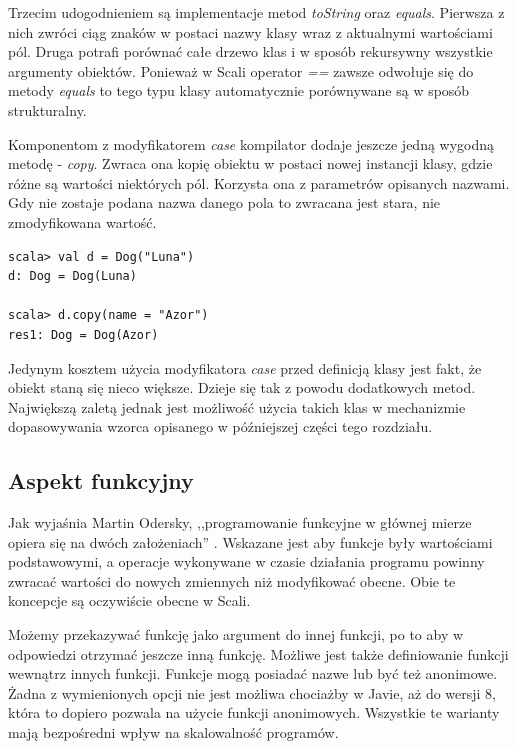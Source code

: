 \documentclass[brudnopis]{xmgr}
\begin{document}
Trzecim udogodnieniem są implementacje metod \emph{toString} oraz \emph{equals}. Pierwsza z nich zwróci ciąg znaków w postaci nazwy klasy wraz z aktualnymi wartościami pól. Druga potrafi porównać całe drzewo klas i w sposób rekursywny wszystkie argumenty obiektów. Ponieważ w Scali operator \emph{==} zawsze odwołuje się do metody \emph{equals} to tego typu klasy automatycznie porównywane są w sposób strukturalny.    

Komponentom z modyfikatorem \emph{case} kompilator dodaje jeszcze jedną wygodną metodę - \emph{copy}. Zwraca ona kopię obiektu w postaci nowej instancji klasy, gdzie różne są wartości niektórych pól. Korzysta ona z parametrów opisanych nazwami. Gdy nie zostaje podana nazwa danego pola to zwracana jest stara, nie zmodyfikowana wartość. 

\begin{verbatim}
scala> val d = Dog("Luna")
d: Dog = Dog(Luna)

scala> d.copy(name = "Azor")
res1: Dog = Dog(Azor)
\end{verbatim}

Jedynym kosztem użycia modyfikatora \emph{case} przed definicją klasy jest fakt, że obiekt staną się nieco większe. Dzieje się tak z powodu dodatkowych metod. Największą zaletą jednak jest możliwość użycia takich klas w mechanizmie dopasowywania wzorca opisanego w późniejszej części tego rozdziału.

\subsection{Aspekt funkcyjny}

Jak wyjaśnia Martin Odersky, ,,programowanie funkcyjne w głównej mierze opiera się na dwóch założeniach'' \cite[s.57]{Odersky:2010:PIS}. Wskazane jest aby funkcje były wartościami podstawowymi, a operacje wykonywane w czasie działania programu powinny zwracać wartości do nowych zmiennych niż modyfikować obecne. Obie te koncepcje są oczywiście obecne w Scali. 

Możemy przekazywać funkcję jako argument do innej funkcji, po to aby w odpowiedzi otrzymać jeszcze inną funkcję. Możliwe jest także definiowanie funkcji wewnątrz innych funkcji. Funkcje mogą posiadać nazwe lub być też anonimowe. Żadna z wymienionych opcji nie jest możliwa chociażby w Javie, aż do wersji 8, która to dopiero pozwala na użycie funkcji anonimowych. Wszystkie te warianty mają bezpośredni wpływ na skalowalność programów.
\end{document}
